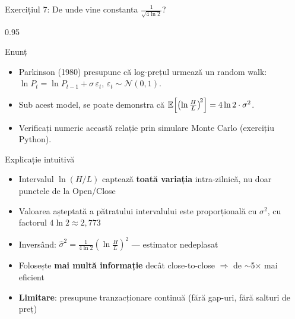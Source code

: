 \documentclass[9pt, aspectratio=169, t]{beamer}
\begin{document}
\begin{frame}[shrink=10]{Exercițiul 7: De unde vine constanta $\frac{1}{\sqrt{4\ln 2}}$?}
    \begin{cminipage}{0.95\textwidth}
    \begin{block}{Enunț}
    \begin{itemize}\setlength{\itemsep}{0pt}
        \item Parkinson (1980) presupune că log-prețul urmează un random walk: $\ln P_t = \ln P_{t-1} + \sigma\,\varepsilon_t$, $\varepsilon_t \sim \mathcal{N}(0,1)$.
        \item Sub acest model, se poate demonstra că $\mathbb{E}\!\left[\left(\ln\frac{H}{L}\right)^{\!2}\right] = 4\ln 2 \cdot \sigma^2$.
        \item Verificați numeric această relație prin simulare Monte Carlo (exercițiu Python).
    \end{itemize}
    \end{block}
    \vspace{0.1cm}
    \begin{exampleblock}{Explicație intuitivă}
    \begin{itemize}\setlength{\itemsep}{0pt}
        \item Intervalul $\ln(H/L)$ captează \textbf{toată variația} intra-zilnică, nu doar punctele de la Open/Close
        \item Valoarea așteptată a pătratului intervalului este proporțională cu $\sigma^2$, cu factorul $4\ln 2 \approx 2{,}773$
        \item Inversând: $\hat{\sigma}^2 = \frac{1}{4\ln 2}\left(\ln\frac{H}{L}\right)^{\!2}$ --- estimator nedeplasat
        \item Folosește \textbf{mai multă informație} decât close-to-close $\Rightarrow$ de $\sim$5$\times$ mai eficient
        \item \textbf{Limitare}: presupune tranzacționare continuă (fără gap-uri, fără salturi de preț)
    \end{itemize}
    \end{exampleblock}
    \end{cminipage}
\end{frame}
\end{document}

